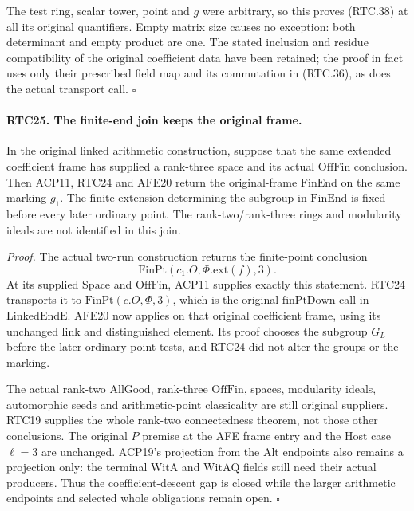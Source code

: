 \documentclass[11pt,a4paper]{article}
\numberwithin{equation}{section}
\theoremstyle{remark}\newtheorem{remark}[theorem]{Remark}
\begin{document}
The test ring, scalar tower, point and \(g\) were arbitrary,
so this proves (RTC.38) at all its original quantifiers.  Empty
matrix size causes no exception: both determinant and empty product
are one.  The stated inclusion and residue compatibility of the
original coefficient data have been retained; the proof in fact
uses only their prescribed field map and its commutation in
(RTC.36), as does the actual transport call. \hfill\(\square\)

\paragraph{RTC25. The finite-end join keeps the original frame.}
\label{claim:RTC25}
In the original linked arithmetic construction, suppose that the
same extended coefficient frame has supplied a rank-three space
and its actual \(\mathrm{OffFin}\) conclusion.  Then ACP11,
RTC24 and AFE20 return the original-frame \(\mathrm{FinEnd}\)
on the same marking \(g_1\).  The finite extension determining
the subgroup in \(\mathrm{FinEnd}\) is fixed before every
later ordinary point.  The rank-two/rank-three rings and modularity
ideals are not identified in this join.

\emph{Proof.}
The actual two-run construction returns the finite-point conclusion
\[
 \mathrm{FinPt}(c_1.O,\Phi.\mathrm{ext}(f),3).
\]
At its supplied \(\mathrm{Space}\) and \(\mathrm{OffFin}\),
ACP11 supplies exactly this statement.  RTC24 transports it to
\(\mathrm{FinPt}(c.O,\Phi,3)\), which is the original
\(\mathrm{finPtDown}\) call in \(\mathrm{LinkedEndE}\).
AFE20 now applies on that original coefficient frame, using its
unchanged link and distinguished element.  Its proof chooses the
subgroup \(G_L\) before the later ordinary-point tests, and
RTC24 did not alter the groups or the marking.

The actual rank-two \(\mathrm{AllGood}\), rank-three
\(\mathrm{OffFin}\), spaces, modularity ideals, automorphic
seeds and arithmetic-point classicality are still original
suppliers.  RTC19 supplies the whole rank-two connectedness
theorem, not those other conclusions.  The original \(P\)
premise at the AFE frame entry and the Host case \(\ell=3\)
are unchanged.  ACP19's projection from the Alt endpoints also
remains a projection only: the terminal \(\mathrm{WitA}\)
and \(\mathrm{WitAQ}\) fields still need their actual producers.
Thus the coefficient-descent gap is closed while the larger
arithmetic endpoints and selected whole obligations remain open.
\hfill\(\square\)
\end{document}
